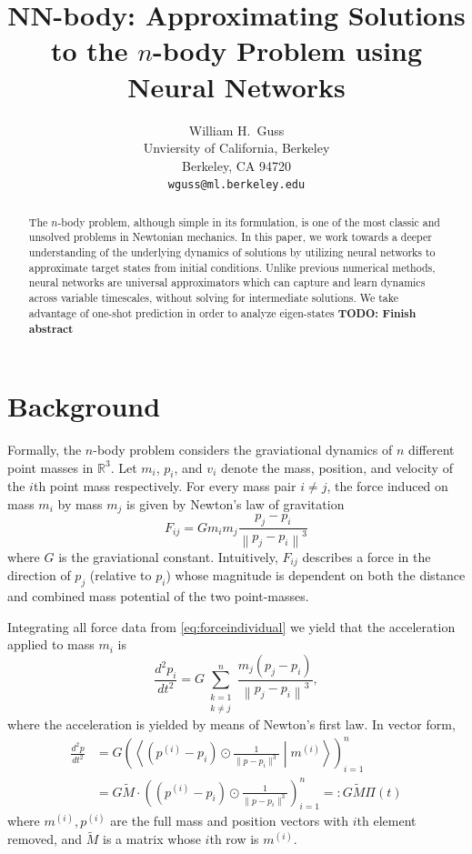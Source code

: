 \documentclass{article}
\title{NN-body: Approximating Solutions to the $n$-body Problem using Neural Networks}
\author{
  William H.~Guss \\
  Unviersity of California, Berkeley\\
  Berkeley, CA 94720 \\
  \texttt{wguss@ml.berkeley.edu} 
}
\numberwithin{theorem}{section}
\numberwithin{equation}{section}
\begin{document}

\maketitle

\begin{abstract} 
The $n$-body problem, although simple in its formulation, is one of the most classic and unsolved problems in Newtonian mechanics. In this paper, we work towards a deeper understanding of the underlying dynamics of solutions by utilizing neural networks to approximate target states from initial conditions. Unlike previous numerical methods, neural networks are universal approximators which can capture and learn dynamics across variable timescales, without solving for intermediate solutions. We take advantage of one-shot prediction in order to analyze eigen-states \textbf{TODO: Finish abstract}
\end{abstract} 


\section{Background} Formally, the $n$-body problem considers the graviational dynamics of $n$ different point masses in $\mathbb{R}^3$. Let $m_i$, $p_i$, and $v_i$ denote the mass, position, and velocity of the $i$th point mass respectively. For every mass pair $i \neq j$, the force induced on mass $m_i$ by mass $m_j$ is given by Newton's law of gravitation
\begin{equation}\label{eq:forceindividual}
	F_{ij} = G m_i m_j \frac{p_j - p_i}{\left\|p_j - p_i\right\|^3}
\end{equation}
where $G$ is the graviational constant. Intuitively, $F_{ij}$ describes a force in the direction of $p_j$ (relative to $p_i$) whose magnitude is dependent on both the distance and combined mass potential of the two point-masses.

Integrating all force data from \eqref{eq:forceindividual} we yield that the acceleration applied to mass $m_i$ is
\begin{equation}
	\frac{d^2p_i}{dt^2}= G \sum_{\substack{k=1 \\ k\neq j}}^n  \frac{ m_j(p_j - p_i)}{\left\|p_j - p_i\right\|^3},
\end{equation}
where the acceleration is yielded by means of Newton's first law. In vector form,
\begin{equation}\label{eq:nbodyvec}
\begin{aligned}
	\frac{d^2p}{dt^2} &= G \left({\left\langle \left(p^{(i)} - p_i\right)\odot \frac{1}{\|p - p_i\|^3} \mathrel{}\middle|\mathrel{} m^{(i)} \right\rangle}\right)_{i=1}^n \\
	&= G  \tilde{M} \cdot \left(\left(p^{(i)} - p_i\right)\odot \frac{1}{\|p - p_i\|^3} \right)_{i=1}^n =: G \tilde{M}  \Pi(t)
\end{aligned}
\end{equation}
where $m^{(i)}, p^{(i)}$ are the full mass and position vectors with $i$th element removed, and $\tilde{M}$ is a matrix whose $i$th row is $m^{(i)}$.
\end{document}
